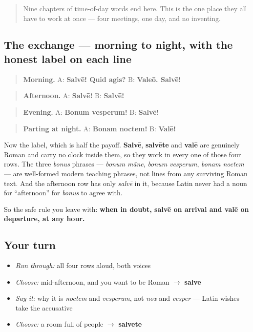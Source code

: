 \label{lesson:LA-C36-practice}



\begin{quote}
Nine chapters of time-of-day words end here. This is the one place they all have to work at once — four meetings, one day, and no inventing.
\end{quote}

\subsection*{The exchange — morning to night, with the honest label on each line}
\begin{quote}
\textbf{Morning.} A: \textbf{Salvē! Quid agis?}  B: \textbf{Valeō. Salvē!}
\end{quote}

\begin{quote}
\textbf{Afternoon.} A: \textbf{Salvē!}  B: \textbf{Salvē!}
\end{quote}

\begin{quote}
\textbf{Evening.} A: \textbf{Bonum vesperum!}  B: \textbf{Salvē!}
\end{quote}

\begin{quote}
\textbf{Parting at night.} A: \textbf{Bonam noctem!}  B: \textbf{Valē!}
\end{quote}

Now the label, which is half the payoff. \textbf{Salvē}, \textbf{salvēte} and \textbf{valē} are genuinely Roman and carry no clock inside them, so they work in every one of those four rows. The three \emph{bonus} phrases — \emph{bonum māne}, \emph{bonum vesperum}, \emph{bonam noctem} — are well-formed modern teaching phrases, not lines from any surviving Roman text. And the afternoon row has only \emph{salvē} in it, because Latin never had a noun for \textquotedblleft{}afternoon\textquotedblright{} for \emph{bonus} to agree with.

So the safe rule you leave with: \textbf{when in doubt, salvē on arrival and valē on departure, at any hour.}

\subsection*{Your turn}
\begin{itemize}
\raggedright
  \item \emph{Run through:} all four rows aloud, both voices
  \item \emph{Choose:} mid-afternoon, and you want to be Roman $\to$ \textbf{salvē}
  \item \emph{Say it:} why it is \emph{noctem} and \emph{vesperum}, not \emph{nox} and \emph{vesper} — Latin wishes take the accusative
  \item \emph{Choose:} a room full of people $\to$ \textbf{salvēte}
\end{itemize}

